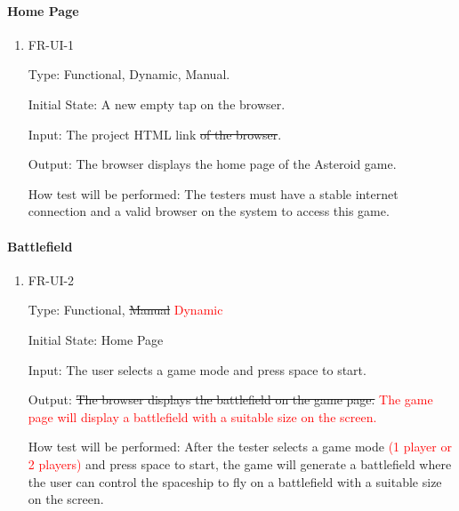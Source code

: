 \documentclass[12pt, titlepage]{article}
\begin{document}
\paragraph{Home Page}

\begin{enumerate}

\item{FR-UI-1\\}

Type: Functional, Dynamic, Manual.
					
Initial State: A new empty tap on the browser.
					
Input: The project HTML link \sout{of the browser}.
					
Output: The browser displays the home page of the Asteroid game.
					
How test will be performed: The testers must have a stable internet connection and a valid browser on the system to access this game.
\\
\end{enumerate}
\paragraph{Battlefield}

\begin{enumerate}					
\item{FR-UI-2\\}

Type: Functional, \sout{Manual} \textcolor{red}{Dynamic}
					
Initial State: Home Page
					
Input: The user selects a game mode and press space to start.
					
Output: \sout{ The browser displays the battlefield on the game
page.
}\textcolor{red}{The game page will display a battlefield with a suitable size on the screen.}
					
How test will be performed: After the tester selects a game mode\textcolor{red}{ (1 player or 2 players)} and press space to start, the game will generate a battlefield where the user can control the spaceship to fly on a battlefield with a suitable size on the screen.

\end{enumerate}
\end{document}
